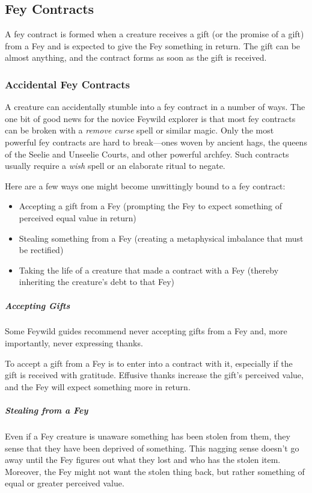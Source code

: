 \documentclass[10pt,a4paper,twoside,bg=print,twocolumn,openany,nodeprecatedcode]{dndbook}
\begin{document}
\subsection{Fey Contracts}
A fey contract is formed when a creature receives a gift (or the promise of a gift) from a Fey and is expected to give the Fey something in return. The gift can be almost anything, and the contract forms as soon as the gift is received.

\subsubsection{Accidental Fey Contracts}
A creature can accidentally stumble into a fey contract in a number of ways. The one bit of good news for the novice Feywild explorer is that most fey contracts can be broken with a \textit{remove curse} spell or similar magic. Only the most powerful fey contracts are hard to break—ones woven by ancient hags, the queens of the Seelie and Unseelie Courts, and other powerful archfey. Such contracts usually require a \textit{wish} spell or an elaborate ritual to negate.

Here are a few ways one might become unwittingly bound to a fey contract:


\begin{itemize}
\item Accepting a gift from a Fey (prompting the Fey to expect something of perceived equal value in return)
\item Stealing something from a Fey (creating a metaphysical imbalance that must be rectified)
\item Taking the life of a creature that made a contract with a Fey (thereby inheriting the creature's debt to that Fey)
\end{itemize}

\subparagraph{Accepting Gifts}
Some Feywild guides recommend never accepting gifts from a Fey and, more importantly, never expressing thanks.

To accept a gift from a Fey is to enter into a contract with it, especially if the gift is received with gratitude. Effusive thanks increase the gift's perceived value, and the Fey will expect something more in return.

\subparagraph{Stealing from a Fey}
Even if a Fey creature is unaware something has been stolen from them, they sense that they have been deprived of something. This nagging sense doesn't go away until the Fey figures out what they lost and who has the stolen item. Moreover, the Fey might not want the stolen thing back, but rather something of equal or greater perceived value.
\end{document}

